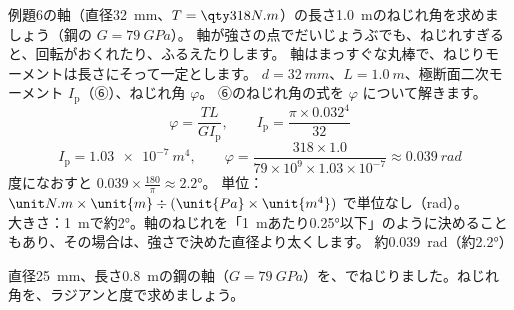 \begin{phreidai}[軸のねじれ角]
\label{ph:力-11:ex7}例題6の軸（直径\qty{32}{mm}、$T=\pxlq{318}{N.m}$）の長さ\qty{1.0}{m}のねじれ角を求めましょう（鋼の $G=\qty{79}{GPa}$）。
\phbamen
軸が強さの点でだいじょうぶでも、ねじれすぎると、回転がおくれたり、ふるえたりします。
\phmushi
軸はまっすぐな丸棒で、ねじりモーメントは長さにそって一定とします。
\phzu
$d=\qty{32}{mm}$、$L=\qty{1.0}{m}$、極断面二次モーメント $I_{\mathrm p}$（⑥）、ねじれ角 $\varphi$。
\phriyu
⑥のねじれ角の式を $\varphi$ について解きます。
\phtateru
\[ \varphi=\frac{TL}{GI_{\mathrm p}},\qquad I_{\mathrm p}=\frac{\pi\times0.032^4}{32} \]
\phtoku
\[ I_{\mathrm p}=\qty{1.03e-7}{m^4},\qquad \varphi=\frac{318\times1.0}{79\times10^9\times1.03\times10^{-7}}\approx\qty{0.039}{rad} \]
度になおすと $0.039\times\tfrac{180}{\pi}\approx2.2°$。
\phtashikame
単位：$\pxlu{N.m}\times\unit{m}\div(\unit{Pa}\times\unit{m^4})$ で単位なし（rad）。\\
大きさ：\qty{1}{m}で約2°。軸のねじれを「\qty{1}{m}あたり0.25°以下」のように決めることもあり、その場合は、強さで決めた直径より太くします。
\kotae 約\qty{0.039}{rad}（約2.2°）
\end{phreidai}
\begin{jibun}
直径\qty{25}{mm}、長さ\qty{0.8}{m}の鋼の軸（$G=\qty{79}{GPa}$）を、でねじりました。ねじれ角を、ラジアンと度で求めましょう。
\end{jibun}

